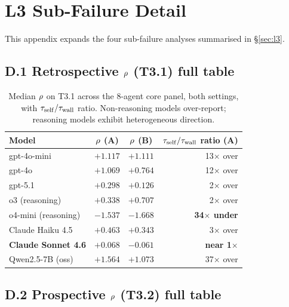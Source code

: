 
\section{L3 Sub-Failure Detail}
\label{app:l3-detail}

This appendix expands the four sub-failure analyses summarised in \S\ref{sec:l3}.

\subsection*{D.1 Retrospective $\rho$ (T3.1) full table}

\begin{table}[h]
\centering
\caption{Median $\rho$ on T3.1 across the 8-agent core panel, both settings, with $\tau_{\mathrm{self}} / \tau_{\mathrm{wall}}$ ratio. Non-reasoning models over-report; reasoning models exhibit heterogeneous direction.}
\label{tab:l3-rho-retro}
\small
\begin{tabular}{lccr}
\toprule
Model & $\rho$ (A) & $\rho$ (B) & $\tau_{\mathrm{self}}/\tau_{\mathrm{wall}}$ ratio (A) \\
\midrule
gpt-4o-mini & $+1.117$ & $+1.111$ & 13$\times$ over \\
gpt-4o & $+1.069$ & $+0.764$ & 12$\times$ over \\
gpt-5.1 & $+0.298$ & $+0.126$ & 2$\times$ over \\
o3 (reasoning) & $+0.338$ & $+0.707$ & 2$\times$ over \\
o4-mini (reasoning) & $\mathbf{-1.537}$ & $\mathbf{-1.668}$ & \textbf{34$\times$ under} \\
Claude Haiku 4.5 & $+0.463$ & $+0.343$ & 3$\times$ over \\
\textbf{Claude Sonnet 4.6} & $\mathbf{+0.068}$ & $-0.061$ & \textbf{near 1$\times$} \\
Qwen2.5-7B (oss) & $+1.564$ & $+1.073$ & 37$\times$ over \\
\bottomrule
\end{tabular}
\end{table}

\subsection*{D.2 Prospective $\rho$ (T3.2) full table}

